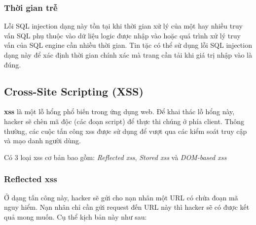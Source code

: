 \documentclass[../main-report.tex]{subfiles}
\begin{document}
\subsubsection*{Thời gian trễ}
Lỗi SQL injection dạng này tồn tại khi thời gian xử lý của một hay nhiều truy vấn SQL phụ thuộc vào dữ liệu logic được nhập vào hoặc quá trình xử lý truy vấn của SQL engine cần nhiều thời gian. Tin tặc có thể sử dụng lỗi SQL injection dạng này để xác định thời gian chính xác mà trang cần tải khi giá trị nhập vào là đúng.

\subsection{Cross-Site Scripting (XSS)}
\textbf{\acrfull{xss}} là một lỗ hổng phổ biến trong ứng dụng web. Để khai thác lỗ hổng này, hacker sẽ chèn mã độc (các đoạn script) để thực thi chúng ở phía client. Thông thường, các cuộc tấn công \acrshort{xss} được sử dụng để vượt qua các kiểm soát truy cập và mạo danh người dùng.

Có 3 loại \acrshort{xss} cơ bản bao gồm: \emph{Reflected \acrshort{xss}}, \emph{Stored \acrshort{xss}} và \emph{DOM-based \acrshort{xss}}

\subsubsection*{Reflected \acrshort{xss}}
Ở dạng tấn công này, hacker sẽ gửi cho nạn nhân một URL có chứa đoạn mã nguy hiểm. Nạn nhân chỉ cần gửi request đến URL này thì hacker sẽ có được kết quả mong muốn. Cụ thể kịch bản này như sau:
\end{document}
